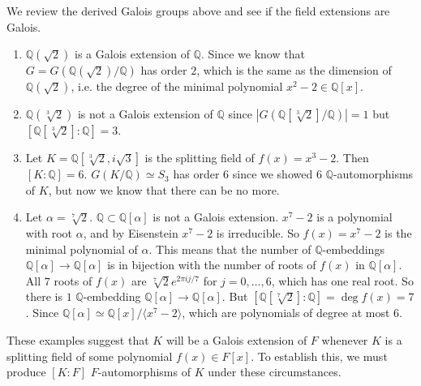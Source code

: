   \begin{example}
    We review the derived Galois groups above and see if the field extensions are Galois. 
    \begin{enumerate}
      \item $\mathbb{Q}(\sqrt{2})$ is a Galois extension of $\mathbb{Q}$. Since we know that $G = G(\mathbb{Q}(\sqrt{2})/\mathbb{Q})$ has order $2$, which is the same as the dimension of $\mathbb{Q}(\sqrt{2})$, i.e. the degree of the minimal polynomial $x^2 - 2 \in \mathbb{Q}[x]$. 
      \item $\mathbb{Q}(\sqrt[3]{2})$ is not a Galois extension of $\mathbb{Q}$ since $|G(\mathbb{Q}[\sqrt[3]{2}]/\mathbb{Q})| = 1$ but $[\mathbb{Q}[\sqrt[3]{2}] : \mathbb{Q}] = 3$. 
      \item Let $K = \mathbb{Q}[\sqrt[3]{2}, i \sqrt{3}]$ is the splitting field of $f(x) = x^3 - 2$. Then $[K:\mathbb{Q}] = 6$. $G(K/\mathbb{Q}) \simeq S_3$ has order $6$ since we showed 6 $\mathbb{Q}$-automorphisms of $K$, but now we know that there can be no more. 
      \item Let $\alpha = \sqrt[7]{2}$. $\mathbb{Q} \subset \mathbb{Q}[\alpha]$ is not a Galois extension. $x^7 - 2$ is a polynomial with root $\alpha$, and by Eisenstein $x^7 - 2$ is irreducible. So $f(x) = x^7 - 2$ is the minimal polynomial of $\alpha$. This means that the number of $\mathbb{Q}$-embeddings $\mathbb{Q}[\alpha] \to \mathbb{Q}[\alpha]$ is in bijection with the number of roots of $f(x)$ in $\mathbb{Q}[\alpha]$. All $7$ roots of $f(x)$ are $\sqrt[7]{2} e^{2\pi i j/7}$ for $j = 0, \ldots, 6$, which has one real root. So there is $1$ $\mathbb{Q}$-embedding $\mathbb{Q}[\alpha] \to \mathbb{Q}[\alpha]$. But $[\mathbb{Q}[\sqrt[7]{2}] : \mathbb{Q}] = \deg{f(x)} = 7$. Since $\mathbb{Q}[\alpha] \simeq \mathbb{Q}[x]/{\langle x^7 - 2 \rangle}$, which are polynomials of degree at most $6$. 
    \end{enumerate}
  \end{example}

  These examples suggest that $K$ will be a Galois extension of $F$ whenever $K$ is a splitting field of some polynomial $f(x) \in F[x]$. To establish this, we must produce $[K:F]$ $F$-automorphisms of $K$ under these circumstances. 


